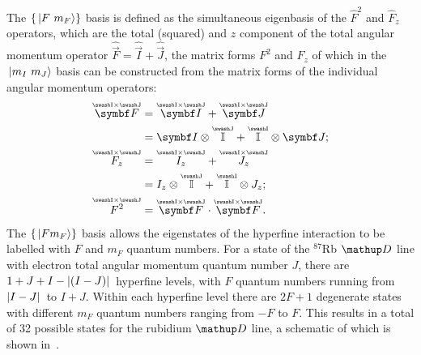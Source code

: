 The $\{\ket{F\ m_F}\}$ basis is defined as the simultaneous eigenbasis of the $\hat F^2$ and $\hat F_z$ operators, which are the total (squared) and $z$ component of the total angular momentum operator $\hat{\vec{F}} = \hat{\vec{I}} + \hat{\vec{J}}$, the matrix forms $F^2$ and $F_z$ of which in the $\ket{m_I\ m_J}$ basis can be constructed from the matrix forms of the individual angular momentum operators:
\begin{align}
\oversetIJ{\vec F} &= \oversetIJ{\vec I} + \oversetIJ{\vec J}\nonumber\\
& = \vec I \otimes \oversetJ{\mathbb{I}} + \oversetI{\mathbb{I}} \otimes \vec J;\\
\oversetIJ{F_z} &= \oversetIJ {I_z} + \oversetIJ {J_z}\nonumber\\
& = I_z \otimes \oversetJ{\mathbb{I}} + \oversetI{\mathbb{I}} \otimes J_z;\\
\oversetIJ {F^2} &= \oversetIJ{\vec F}\cdot\oversetIJ{\vec F}.
\end{align}
The $\{\ket{F m_F}\}$ basis allows the eigenstates of the hyperfine interaction to be labelled with $F$ and $m_F$ quantum numbers. For a state of the $^{87}$Rb $\up{D}$ line with electron total angular momentum quantum number $J$, there are $1+J+I - \abs{(I - J)}$ hyperfine levels, with $F$ quantum numbers running from $\abs{I - J}$ to $I + J$. Within each hyperfine level there are $2F + 1$ degenerate states with different $m_F$ quantum numbers ranging from $-F$ to $F$. This results in a total of 32 possible states for the rubidium $\up{D}$ line, a schematic of which is shown in~.

